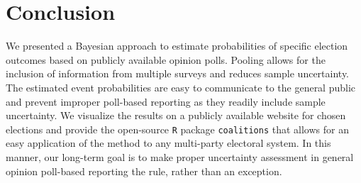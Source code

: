\documentclass[smallcondensed]{svjour3}     %
\begin{document}
\section{Conclusion} \label{sec:conclusion}
We presented a Bayesian approach to estimate probabilities of specific election outcomes based on
publicly available opinion polls. Pooling allows for the inclusion of information from multiple
surveys and reduces sample uncertainty.
The estimated event probabilities are easy to communicate to the general public and prevent
improper poll-based reporting as they readily include sample uncertainty.
We visualize the results on a publicly available website for chosen elections and
provide the open-source \texttt{R} package \texttt{coalitions} that allows for an easy
application of the method to any multi-party electoral system.
In this manner, our long-term goal is to make proper uncertainty assessment
in general opinion poll-based reporting the rule, rather than an exception.



%
\end{document}
